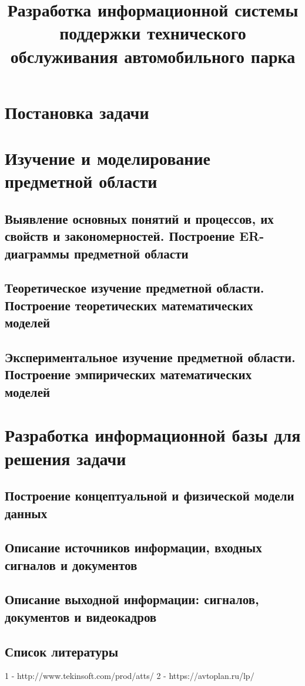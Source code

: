 \documentclass{lstu-diploma}
\title{Разработка информационной системы поддержки технического обслуживания автомобильного парка}
\begin{document}
\maketitle

\tableofcontents

\chapter{Постановка задачи}




\chapter{Изучение и моделирование предметной области}
\section{Выявление основных понятий и процессов, их свойств и закономерностей. Построение ER-диаграммы предметной области}

\section{Теоретическое изучение предметной области. Построение теоретических математических моделей}

\section{Экспериментальное изучение предметной области. Построение эмпирических математических моделей}

\chapter{Разработка информационной базы для решения задачи}

\section{Построение концептуальной и физической модели данных}

\section{Описание источников информации, входных сигналов и документов}

\section{Описание выходной информации: сигналов, документов и видеокадров}

\section*{Список литературы}
1 - http://www.tekinsoft.com/prod/atts/
2 - https://avtoplan.ru/lp/
\end{document}
